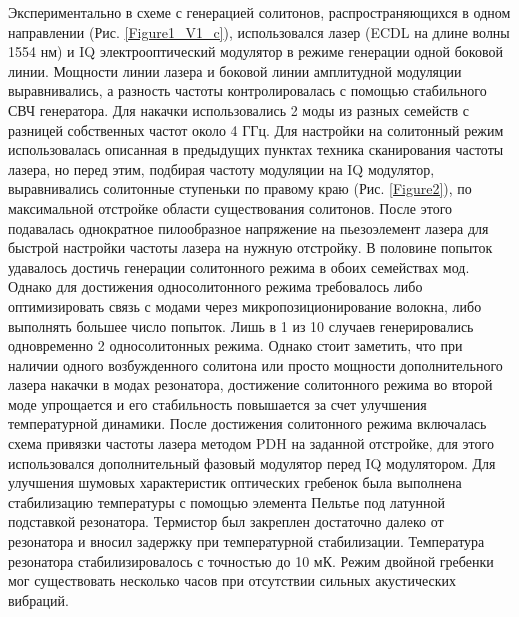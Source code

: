 Экспериментально в схеме с генерацией солитонов, распространяющихся в одном направлении (Рис. \ref{Figure1_V1_c}), использовался лазер (ECDL на длине волны 1554 нм) и IQ электрооптический модулятор в режиме генерации одной боковой линии. Мощности линии лазера и боковой линии амплитудной модуляции выравнивались, а разность частоты контролировалась с помощью стабильного СВЧ генератора. Для накачки использовались 2 моды из разных семейств с разницей собственных частот около 4 ГГц. Для настройки на солитонный режим использовалась описанная в предыдущих пунктах техника сканирования частоты лазера, но перед этим, подбирая частоту модуляции на IQ модулятор, выравнивались солитонные ступеньки по правому краю (Рис. \ref{Figure2}), по максимальной отстройке области существования солитонов. После этого подавалась однократное пилообразное напряжение на пьезоэлемент лазера для быстрой настройки частоты лазера на нужную отстройку. В половине попыток удавалось достичь генерации солитонного режима в обоих семействах мод. Однако для достижения односолитонного режима требовалось либо оптимизировать связь с модами через микропозиционирование волокна, либо выполнять большее число попыток. Лишь в 1 из 10 случаев генерировались одновременно 2 односолитонных режима. Однако стоит заметить, что при наличии одного возбужденного солитона или просто мощности дополнительного лазера накачки в модах резонатора, достижение солитонного режима во второй моде упрощается и его стабильность повышается за счет улучшения температурной динамики. После достижения солитонного режима включалась схема привязки частоты лазера методом PDH на заданной отстройке, для этого использовался дополнительный фазовый модулятор перед IQ модулятором. Для улучшения шумовых характеристик оптических гребенок была выполнена стабилизацию температуры с помощью элемента Пельтье под латунной подставкой резонатора. Термистор был закреплен достаточно далеко от резонатора и вносил задержку при температурной стабилизации. Температура резонатора стабилизировалось с точностью до 10 мК. Режим двойной гребенки мог существовать несколько часов при отсутствии сильных акустических вибраций.


